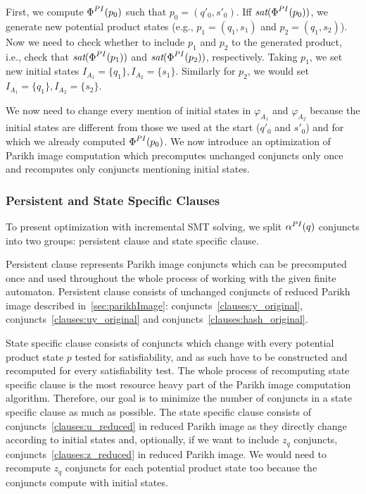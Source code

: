 First, we compute $\emph{$\Phi$}^{PI}(p_0)$ such that $p_0 = (q'_0,s'_0)$. Iff $\emph{sat}(\emph{$\Phi$}^{PI}(p_0))$, we generate new potential product states (e.g., $p_1 = (q_1, s_1)$ and $p_2 = (q_1, s_2)$). Now we need to check whether to include $p_1$ and $p_2$ to the generated product, i.e., check that $\emph{sat}(\emph{$\Phi$}^{PI}(p_1))$ and $\emph{sat}(\emph{$\Phi$}^{PI}(p_2))$, respectively. Taking $p_1$, we set new initial states $I_{A_1} = \{q_1\}, I_{A_2} = \{s_1\}$. Similarly for $p_2$, we would set $I_{A_1} = \{q_1\}, I_{A_2} = \{s_2\}$.

We now need to change every mention of initial states in $\varphi_{A_1}$ and $\varphi_{A_2}$ because the initial states are different from those we used at the start ($q'_0$ and $s'_0$) and for which we already computed $\emph{$\Phi$}^{PI}(p_0)$. We now introduce an optimization of Parikh image computation which precomputes unchanged conjuncts only once and recomputes only conjuncts mentioning initial states.

\subsubsection{Persistent and State Specific Clauses}

To present optimization with incremental SMT solving, we split $\alpha^{PI}(q)$ conjuncts into two groups: persistent clause and state specific clause.

Persistent clause represents Parikh image conjuncts which can be precomputed once and used throughout the whole process of working with the given finite automaton. Persistent clause consists of unchanged conjuncts of reduced Parikh image described in~\ref{sec:parikhImage}: conjuncts~\ref{clauses:y_original}, conjuncts~\ref{clauses:uy_original} and conjuncts~\ref{clauses:hash_original}.

State specific clause consists of conjuncts which change with every potential product state $p$ tested for satisfiability, and as such have to be constructed and recomputed for every satisfiability test. The whole process of recomputing state specific clause is the most resource heavy part of the Parikh image computation algorithm. Therefore, our goal is to minimize the number of conjuncts in a state specific clause as much as possible. The state specific clause consists of conjuncts~\ref{clauses:u_reduced} in reduced Parikh image as they directly change according to initial states and, optionally, if we want to include $z_{q}$ conjuncts, conjuncts~\ref{clauses:z_reduced} in reduced Parikh image. We would need to recompute $z_{q}$ conjuncts for each potential product state too because the conjuncts compute with initial states.

